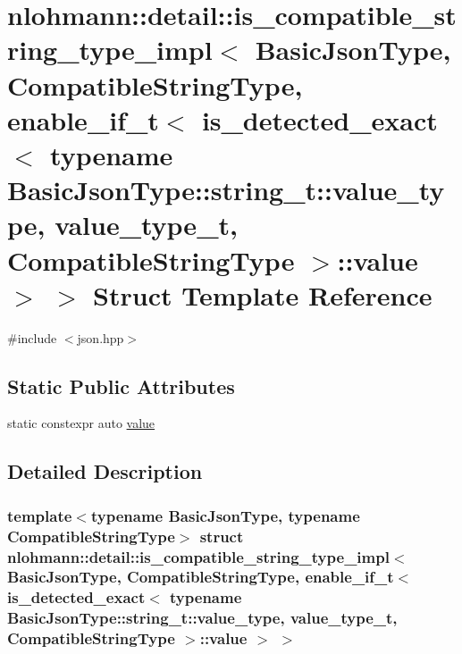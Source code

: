 \hypertarget{structnlohmann_1_1detail_1_1is__compatible__string__type__impl_3_01_basic_json_type_00_01_compat6590904cab40fc73f430e4c7518179a2}{}\section{nlohmann\+::detail\+::is\+\_\+compatible\+\_\+string\+\_\+type\+\_\+impl$<$ Basic\+Json\+Type, Compatible\+String\+Type, enable\+\_\+if\+\_\+t$<$ is\+\_\+detected\+\_\+exact$<$ typename Basic\+Json\+Type\+::string\+\_\+t\+::value\+\_\+type, value\+\_\+type\+\_\+t, Compatible\+String\+Type $>$\+::value $>$ $>$ Struct Template Reference}
\label{structnlohmann_1_1detail_1_1is__compatible__string__type__impl_3_01_basic_json_type_00_01_compat6590904cab40fc73f430e4c7518179a2}


{\ttfamily \#include $<$json.\+hpp$>$}

\subsection*{Static Public Attributes}
\begin{DoxyCompactItemize}
\item 
static constexpr auto \mbox{\hyperlink{structnlohmann_1_1detail_1_1is__compatible__string__type__impl_3_01_basic_json_type_00_01_compat6590904cab40fc73f430e4c7518179a2_adac1e17a2ddf9ac94be736e96e8943a9}{value}}
\end{DoxyCompactItemize}


\subsection{Detailed Description}
\subsubsection*{template$<$typename Basic\+Json\+Type, typename Compatible\+String\+Type$>$\newline
struct nlohmann\+::detail\+::is\+\_\+compatible\+\_\+string\+\_\+type\+\_\+impl$<$ Basic\+Json\+Type, Compatible\+String\+Type, enable\+\_\+if\+\_\+t$<$ is\+\_\+detected\+\_\+exact$<$ typename Basic\+Json\+Type\+::string\+\_\+t\+::value\+\_\+type, value\+\_\+type\+\_\+t, Compatible\+String\+Type $>$\+::value $>$ $>$}



